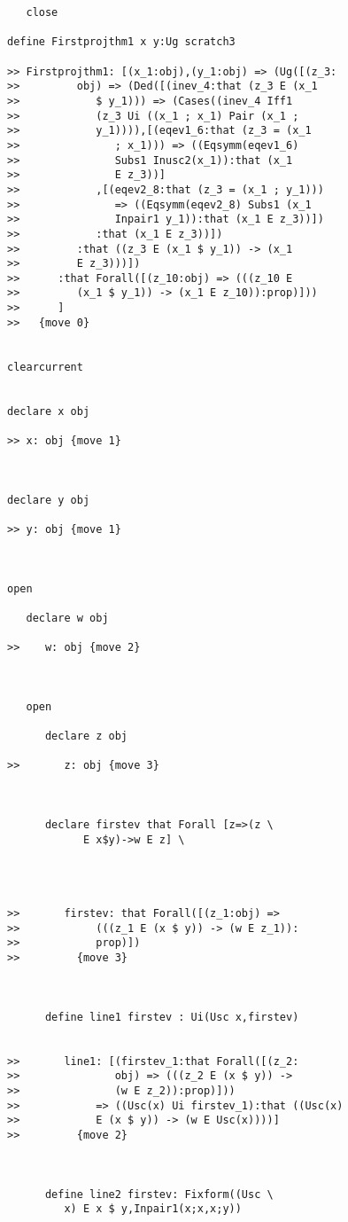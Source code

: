 \documentclass[12pt]{article}
\begin{document}
\begin{verbatim}
   close

define Firstprojthm1 x y:Ug scratch3

>> Firstprojthm1: [(x_1:obj),(y_1:obj) => (Ug([(z_3:
>>         obj) => (Ded([(inev_4:that (z_3 E (x_1
>>            $ y_1))) => (Cases((inev_4 Iff1
>>            (z_3 Ui ((x_1 ; x_1) Pair (x_1 ;
>>            y_1)))),[(eqev1_6:that (z_3 = (x_1
>>               ; x_1))) => ((Eqsymm(eqev1_6)
>>               Subs1 Inusc2(x_1)):that (x_1
>>               E z_3))]
>>            ,[(eqev2_8:that (z_3 = (x_1 ; y_1)))
>>               => ((Eqsymm(eqev2_8) Subs1 (x_1
>>               Inpair1 y_1)):that (x_1 E z_3))])
>>            :that (x_1 E z_3))])
>>         :that ((z_3 E (x_1 $ y_1)) -> (x_1
>>         E z_3)))])
>>      :that Forall([(z_10:obj) => (((z_10 E
>>         (x_1 $ y_1)) -> (x_1 E z_10)):prop)]))
>>      ]
>>   {move 0}


clearcurrent


declare x obj

>> x: obj {move 1}



declare y obj

>> y: obj {move 1}



open

   declare w obj

>>    w: obj {move 2}



   open

      declare z obj

>>       z: obj {move 3}



      declare firstev that Forall [z=>(z \
            E x$y)->w E z] \
         



>>       firstev: that Forall([(z_1:obj) =>
>>            (((z_1 E (x $ y)) -> (w E z_1)):
>>            prop)])
>>         {move 3}



      define line1 firstev : Ui(Usc x,firstev)


>>       line1: [(firstev_1:that Forall([(z_2:
>>               obj) => (((z_2 E (x $ y)) ->
>>               (w E z_2)):prop)]))
>>            => ((Usc(x) Ui firstev_1):that ((Usc(x)
>>            E (x $ y)) -> (w E Usc(x))))]
>>         {move 2}



      define line2 firstev: Fixform((Usc \
         x) E x $ y,Inpair1(x;x,x;y))


\end{verbatim}
\end{document}
